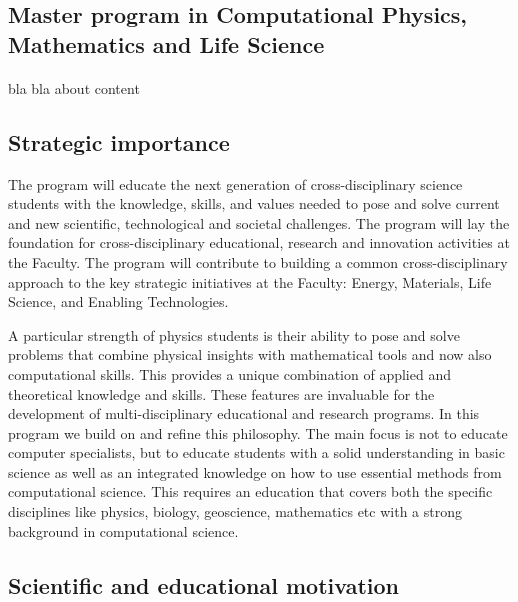 \documentclass[%
oneside,                 %
final,                   %
10pt]{article}
\begin{document}
\subsection*{Master program in Computational Physics, Mathematics and Life Science}

\paragraph{}

bla bla about content



\subsection*{Strategic importance}

The program will educate the next generation of cross-disciplinary
science students with the knowledge, skills, and values needed to pose
and solve current and new scientific, technological and societal
challenges. The program will lay the foundation for cross-disciplinary
educational, research and innovation activities at the Faculty. The
program will contribute to building a common cross-disciplinary
approach to the key strategic initiatives at the Faculty: Energy,
Materials, Life Science, and Enabling Technologies.

A particular strength of physics students is their ability to pose and
solve problems that combine physical insights with mathematical tools
and now also computational skills. This provides a unique combination
of applied and theoretical knowledge and skills. These features are invaluable 
for the development of multi-disciplinary educational and research programs. 
In this program we build on and
refine this philosophy.  The main focus is not to educate computer
specialists, but to educate students with a solid understanding in basic science
as well as an integrated knowledge on how  to use 
essential methods from computational science. This requires an
education that covers both the specific disciplines like physics, biology,
geoscience, mathematics etc with a strong background in computational science.

\subsection*{Scientific and educational motivation}


\end{document}
